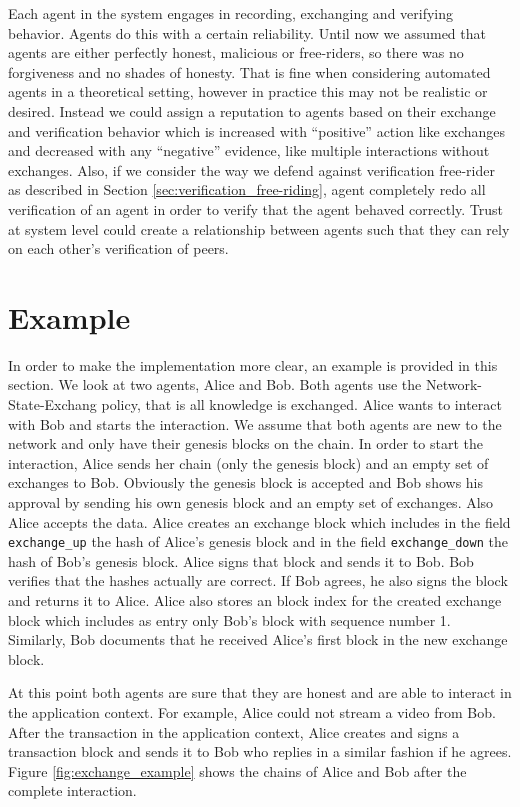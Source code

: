 Each agent in the system engages in recording, exchanging and verifying behavior. Agents do this 
with a certain reliability. Until now we assumed that agents are either perfectly honest, malicious
or free-riders, so there was no forgiveness and no shades of honesty. That is fine when considering
automated agents in a theoretical setting, however in practice this may not be realistic or 
desired. Instead we could assign a reputation to agents based on their exchange and verification 
behavior which is increased with ``positive'' action like exchanges and decreased with any 
``negative'' evidence, like multiple interactions without exchanges. Also, if we consider the way 
we defend against verification free-rider as described in Section \ref{sec:verification_free-riding}, 
agent completely redo all verification of an agent in order to verify that the agent behaved correctly.
Trust at system level could create a relationship between agents such that they can rely on each 
other's verification of peers. 

\section{Example}
In order to make the implementation more clear, an example is provided in this section. We look at two
agents, Alice and Bob. Both agents use the Network-State-Exchang policy, that is all knowledge is 
exchanged. Alice wants to interact with Bob and starts the interaction. We assume that
both agents are new to the network and only have their genesis blocks on the chain. In order to
start the interaction, Alice sends her chain (only the genesis block) and an empty set of exchanges
to Bob. Obviously the genesis block is accepted and Bob shows his approval by sending his own
genesis block and an empty set of exchanges. Also Alice accepts the data. Alice creates an exchange
block which includes in the field \verb|exchange_up| the hash of Alice's genesis block and in the field 
\verb|exchange_down| the hash of Bob's genesis block. Alice signs that block and sends it to Bob. 
Bob verifies that the hashes actually are correct. If Bob agrees, he also signs the block and returns 
it to Alice. Alice also stores an block index for the created exchange block which includes as entry 
only Bob's block with sequence number 1. Similarly, Bob documents that he received Alice's first block
in the new exchange block.

At this point both agents are sure that they are honest and are able to interact in the 
application context. For example, Alice could not stream a video from Bob. After the transaction in 
the application context, Alice creates and signs a transaction block and sends it to Bob who replies 
in a similar fashion if he agrees. Figure \ref{fig:exchange_example} shows the chains of Alice and Bob after the complete interaction. 

